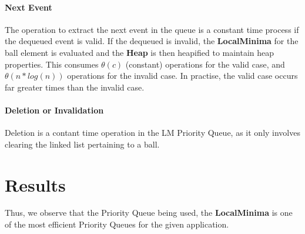 \documentclass[12pt]{article}
\begin{document}
\paragraph{Next Event}
The operation to extract the next event in the queue is a constant time process if the dequeued event is valid. If the dequeued is invalid, the \textbf{LocalMinima} for the ball element is evaluated and the \textbf{Heap} is then heapified to maintain heap properties. This consumes $\theta(c)$ (constant) operations for the valid case, and $\theta(n * log(n))$ operations for the invalid case. In practise, the valid case occurs far greater times than the invalid case.\\
 
\paragraph{Deletion or Invalidation}
Deletion is a contant time operation in the LM Priority Queue, as it only involves clearing the linked list pertaining to a ball.

\section{Results}\label{results}
Thus, we observe that the Priority Queue being used, the \textbf{LocalMinima} is one of the most efficient Priority Queues for the given application.
\end{document}
